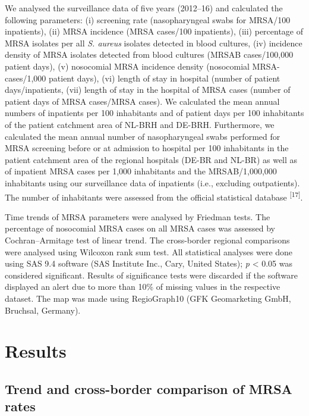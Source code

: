 \documentclass[
]{book}
\begin{document}
We analysed the surveillance data of five years (2012--16) and calculated the following parameters: (i) screening rate (nasopharyngeal swabs for MRSA/100 inpatients), (ii) MRSA incidence (MRSA cases/100 inpatients), (iii) percentage of MRSA isolates per all \emph{S. aureus} isolates detected in blood cultures, (iv) incidence density of MRSA isolates detected from blood cultures (MRSAB cases/100,000 patient days), (v) nosocomial MRSA incidence density (nosocomial MRSA-cases/1,000 patient days), (vi) length of stay in hospital (number of patient days/inpatients, (vii) length of stay in the hospital of MRSA cases (number of patient days of MRSA cases/MRSA cases). We calculated the mean annual numbers of inpatients per 100 inhabitants and of patient days per 100 inhabitants of the patient catchment area of NL-BRH and DE-BRH. Furthermore, we calculated the mean annual number of nasopharyngeal swabs performed for MRSA screening before or at admission to hospital per 100 inhabitants in the patient catchment area of the regional hospitals (DE-BR and NL-BR) as well as of inpatient MRSA cases per 1,000 inhabitants and the MRSAB/1,000,000 inhabitants using our surveillance data of inpatients (i.e., excluding outpatients). The number of inhabitants were assessed from the official statistical database \textsuperscript{{[}17{]}}.

Time trends of MRSA parameters were analysed by Friedman tests. The percentage of nosocomial MRSA cases on all MRSA cases was assessed by Cochran--Armitage test of linear trend. The cross-border regional comparisons were analysed using Wilcoxon rank sum test. All statistical analyses were done using SAS 9.4 software (SAS Institute Inc., Cary, United States); \emph{p} \textless{} 0.05 was considered significant. Results of significance tests were discarded if the software displayed an alert due to more than 10\% of missing values in the respective dataset. The map was made using RegioGraph10 (GFK Geomarketing GmbH, Bruchsal, Germany).

\hypertarget{results-4}{%
\section{Results}\label{results-4}}

\hypertarget{trend-and-cross-border-comparison-of-mrsa-rates}{%
\subsection{Trend and cross-border comparison of MRSA rates}\label{trend-and-cross-border-comparison-of-mrsa-rates}}
\end{document}
